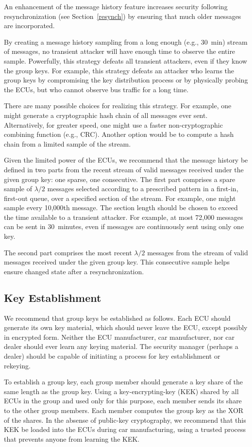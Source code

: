 An enhancement of the message history feature increases security following resynchronization
(see Section~\ref{resynch}) by ensuring that much older messages are incorporated.

By creating a message history sampling from a long enough (e.g., 30~min) stream of messages, 
no transient attacker will have enough time to observe the entire sample.
Powerfully, this strategy defeats all transient attackers, even if they know the group keys.
For example, this strategy defeats an attacker who learns the group keys by compromising
the key distribution process or by physically probing the ECUs, but who cannot
observe bus traffic for a long time.

There are many possible choices for realizing this strategy.  For example,
one might generate a cryptographic hash chain of all messages ever sent.  Alternatively, for
greater speed, one might use a faster non-cryptographic combining function (e.g., CRC).  
Another option would be to compute a hash chain from a limited sample of the stream.

Given the limited power of the ECUs, 
we recommend that the message history be defined in two parts from the recent stream of valid messages
received under the given group key: one sparse, one consecutive.  
The first part comprises a spare sample of $\lambda/2$ messages selected 
according to a prescribed pattern in a first-in, first-out queue, 
over a specified section of the stream.  
For example, one might sample every 10,000th message.  
The section length should be chosen to exceed the time available to a transient attacker.
For example, at most 72,000 messages can be sent in 30~minutes,
even if messages are continuously sent using only one key.

The second part comprises the most recent $\lambda/2$ 
messages from the stream of valid messages received under the given group key.
This consecutive sample helps ensure changed state after a resynchronization.

\subsection{Key Establishment}
\label{key}

We recommend that group keys be established as follows.  Each ECU should generate its own key material,
which should never leave the ECU, except possibly in encrypted form.  Neither the ECU manufacturer, car manufacturer, 
nor car dealer should ever learn any keying material.  The security manager (perhaps a dealer) should be capable of initiating
a process for key establishment or rekeying.

To establish a group key, each group member should generate a key share of the same length as the group key.
Using a key-encrypting-key (KEK) shared by all ECUs in the group and used only for this purpose, 
each member sends its share to the other group members.  Each member computes the group key as the
XOR of the shares.  In the absense of public-key cryptography, we recommend that this KEK be
loaded into the ECUs during car manufacturing, using a trusted process that prevents anyone from
learning the KEK.



